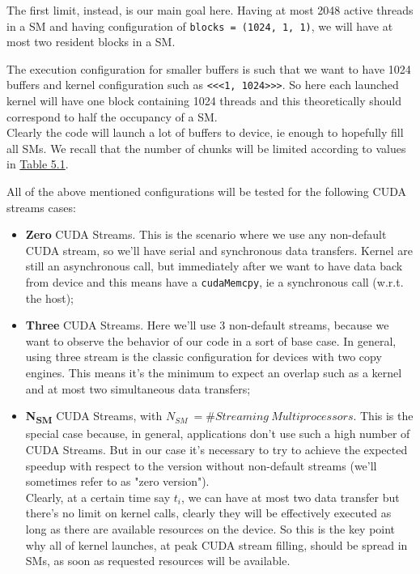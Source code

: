 \begin{enumerate}
		The first limit, instead, is our main goal here. Having at most 2048 active threads in a SM and having configuration of \texttt{blocks = (1024, 1, 1)}, we will have at most two resident blocks in a SM.
		
		The execution configuration for smaller buffers is such that we want to have 1024 buffers and kernel configuration such as \texttt{<<<1, 1024>>>}. 
		So here each launched kernel will have one block containing 1024 threads and this theoretically should correspond to half the occupancy of a SM.\\
		Clearly the code will launch a lot of buffers to device, ie enough to hopefully fill all SMs. We recall that the number of chunks will be limited according to values in \hyperref[tab:cosdata]{Table 5.1}.
		
		All of the above mentioned configurations will be tested for the following CUDA streams cases:		
		\begin{itemize}
			\item \textbf{Zero} CUDA Streams. This is the scenario where we use any non-default CUDA stream, so we'll have serial and synchronous data transfers. Kernel are still an asynchronous call, but immediately after we want to have data back from device and this means have a \texttt{cudaMemcpy}, ie a synchronous call (w.r.t. the host);
			\item \textbf{Three} CUDA Streams. Here we'll use 3 non-default streams, because we want to observe the behavior of our code in a sort of base case. In general, using three stream is the classic configuration for devices with two copy engines. This means it's the minimum to expect an overlap such as a kernel and at most two simultaneous data transfers;
			\item \textbf{N\textsubscript{SM}} CUDA Streams, with \(N_{SM}\ =\#Streaming \ Multiprocessors\). This is the special case because, in general, applications don't use such a high number of CUDA Streams. But in our case it's necessary to try to achieve the expected speedup with respect to the version without non-default streams (we'll sometimes refer to as "zero version").\\
			Clearly, at a certain time say \(t_{i}\), we can have at most two data transfer but there's no limit on kernel calls, clearly they will be effectively executed as long as there are available resources on the device. So this is the key point why all of kernel launches, at peak CUDA stream filling, should be spread in SMs, as soon as requested resources will be available.
		\end{itemize}
		

\end{enumerate}
